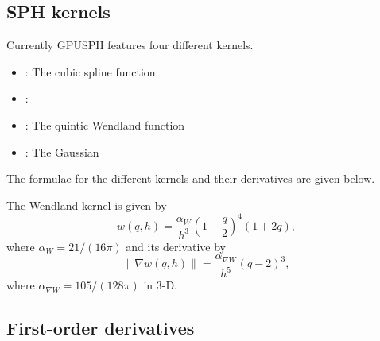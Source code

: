 \documentclass[12pt]{memoir}
\begin{document}
\subsection{SPH kernels}

Currently GPUSPH features four different kernels.
\begin{itemize}
  \item {}: The cubic spline function
  \item {}:
  \item {}: The quintic Wendland function
  \item {}: The Gaussian
\end{itemize}

The formulae for the different kernels and their derivatives are given below.

The Wendland kernel is given by
\begin{equation}
w(q,h) = \frac{\alpha_W}{h^3}\left(1-\frac{q}{2}\right)^4(1+2q),
\label{e:sph:wendland}
\end{equation}
where $\alpha_W = 21/(16\pi)$ and its derivative by
\begin{equation}
\|\nabla w(q,h)\| = \frac{\alpha_{\nabla W}}{h^5}\left(q-2\right)^3,
\label{e:sph:gradwendland}
\end{equation}
where $\alpha_{\nabla W} = 105/(128\pi)$ in 3-D.


\subsection{First-order derivatives}
\end{document}
